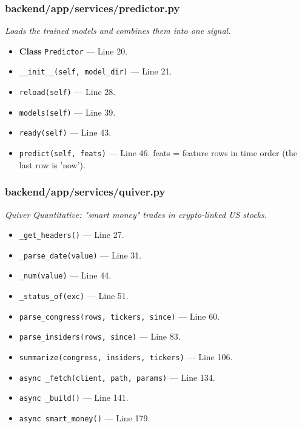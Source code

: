 \subsubsection*{backend/app/services/predictor.py}
\textit{Loads the trained models and combines them into one signal.}
\begin{itemize}[nosep,leftmargin=1.5em]
\item \textbf{Class} \texttt{Predictor} --- Line 20.
\item \hspace*{1em}\texttt{\_\allowbreak{}\_\allowbreak{}init\_\allowbreak{}\_\allowbreak{}(\allowbreak{}self,\allowbreak{} model\_\allowbreak{}dir)} --- Line 21.
\item \hspace*{1em}\texttt{reload(\allowbreak{}self)} --- Line 28.
\item \hspace*{1em}\texttt{models(\allowbreak{}self)} --- Line 39.
\item \hspace*{1em}\texttt{ready(\allowbreak{}self)} --- Line 43.
\item \hspace*{1em}\texttt{predict(\allowbreak{}self,\allowbreak{} feats)} --- Line 46. feats = feature rows in time order (the last row is 'now').
\end{itemize}
\subsubsection*{backend/app/services/quiver.py}
\textit{Quiver Quantitative: "smart money" trades in crypto-linked US stocks.}
\begin{itemize}[nosep,leftmargin=1.5em]
\item \texttt{\_\allowbreak{}get\_\allowbreak{}headers(\allowbreak{})} --- Line 27.
\item \texttt{\_\allowbreak{}parse\_\allowbreak{}date(\allowbreak{}value)} --- Line 31.
\item \texttt{\_\allowbreak{}num(\allowbreak{}value)} --- Line 44.
\item \texttt{\_\allowbreak{}status\_\allowbreak{}of(\allowbreak{}exc)} --- Line 51.
\item \texttt{parse\_\allowbreak{}congress(\allowbreak{}rows,\allowbreak{} tickers,\allowbreak{} since)} --- Line 60.
\item \texttt{parse\_\allowbreak{}insiders(\allowbreak{}rows,\allowbreak{} since)} --- Line 83.
\item \texttt{summarize(\allowbreak{}congress,\allowbreak{} insiders,\allowbreak{} tickers)} --- Line 106.
\item \texttt{async \_\allowbreak{}fetch(\allowbreak{}client,\allowbreak{} path,\allowbreak{} params)} --- Line 134.
\item \texttt{async \_\allowbreak{}build(\allowbreak{})} --- Line 141.
\item \texttt{async smart\_\allowbreak{}money(\allowbreak{})} --- Line 179.
\end{itemize}
